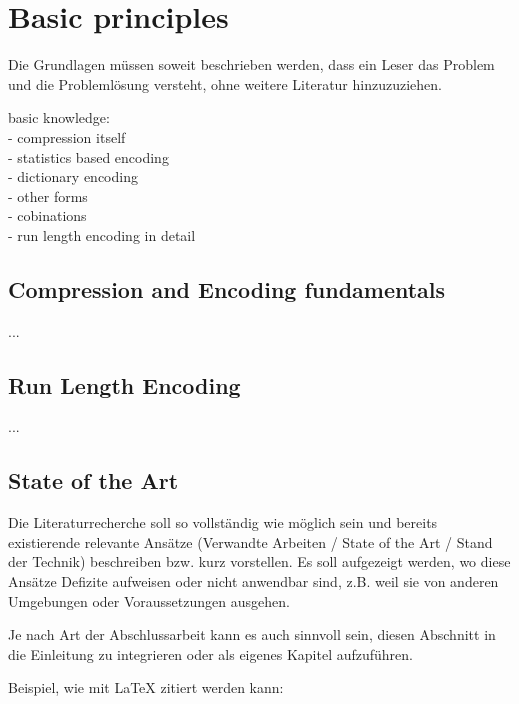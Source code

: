 
\chapter{Basic principles}
\label{ch:Basic principles}
Die Grundlagen müssen soweit beschrieben
werden, dass ein Leser das Problem und
die Problemlösung versteht, ohne weitere Literatur hinzuzuziehen.

basic knowledge:\\

- compression itself \\
- statistics based encoding\\
- dictionary encoding \\
- other forms \\
- cobinations \\
- run length encoding in detail \\


\section{Compression and Encoding fundamentals}
\label{ch:Basic principles:sec:Compression}

...

\section{Run Length Encoding}
\label{ch:Grundlagen:sec:Run Length Encoding}

...

\section{State of the Art}
\label{ch:Grundlagen:sec:SOTA}
Die Literaturrecherche soll so vollständig wie möglich sein und bereits existierende relevante Ansätze (Verwandte Arbeiten / State of the Art / Stand der Technik) beschreiben bzw. kurz vorstellen.
Es soll aufgezeigt werden, wo diese Ansätze Defizite aufweisen oder nicht anwendbar sind, z.B. weil sie von anderen Umgebungen oder Voraussetzungen ausgehen.

Je nach Art der Abschlussarbeit kann es auch sinnvoll sein, diesen Abschnitt in die Einleitung zu integrieren oder als eigenes Kapitel aufzuführen.

Beispiel, wie mit LaTeX zitiert werden kann: \cite{TB98,JSAC96,qosr}

